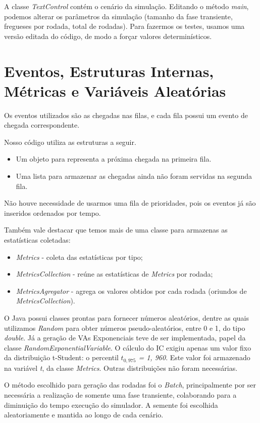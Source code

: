 \documentclass[a4paper,12pt]{report}
\begin{document}
A classe \textit{TextControl} contém o cenário da simulação. Editando o método \textit{main}, podemos alterar os parâmetros da simulação (tamanho da fase transiente, fregueses por rodada, total de rodadas). Para fazermos os testes, usamos uma versão editada do código, de modo a forçar valores determinísticos.

\section{Eventos, Estruturas Internas, Métricas e Variáveis Aleatórias}
Os eventos utilizados são as chegadas nas filas, e cada fila possui um evento de chegada correspondente.

Nosso código utiliza as estruturas a seguir.
\begin{itemize}
  \item Um objeto para representa a próxima chegada na primeira fila.
  \item Uma lista para armazenar as chegadas ainda não foram servidas na segunda fila.
\end{itemize}

Não houve necessidade de usarmos uma fila de prioridades, pois os eventos já são inseridos ordenados por tempo.

Também vale destacar que temos mais de uma classe para armazenas as estatísticas coletadas:
\begin{itemize}
  \item \textit{Metrics} - coleta das estatísticas por tipo;
  \item \textit{MetricsCollection} - reúne as estatísticas de \textit{Metrics} por rodada;
  \item \textit{MetricsAgregator} - agrega os valores obtidos por cada rodada (oriundos de \textit{MetricsCollection}).
\end{itemize}

O Java possui classes prontas para fornecer números aleatórios, dentre as quais utilizamos \textit{Random} para obter números pseudo-aleatórios, entre 0 e 1, do tipo \textit{double}. Já a geração de VAs Exponenciais teve de ser implementada, papel da classe \textit{RandomExponentialVariable}. O cálculo do IC exigiu apenas um valor fixo da distribuição t-Student: o percentil \textit{$t_{0,975}$ = 1, 960}. Este valor foi armazenado na variável \textit{t}, da classe \textit{Metrics}. Outras distribuições não foram necessárias.

O método escolhido para geração das rodadas foi o \textit{Batch}, principalmente por ser necessária a realização de somente uma fase transiente, colaborando para a diminuição do tempo execução do simulador. A semente foi escolhida aleatoriamente e mantida ao longo de cada cenário.
\end{document}
